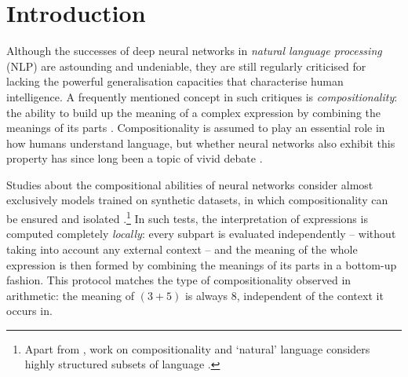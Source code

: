 \section{Introduction}

Although the successes of deep neural networks in \textit{natural language processing} (NLP) are astounding and undeniable, they are still regularly criticised for lacking the powerful generalisation capacities that characterise human intelligence.
A frequently mentioned concept in such critiques is \emph{compositionality}: the ability to build up the meaning of a complex expression by combining the meanings of its parts \citep[e.g.][]{partee1984compositionality}.
Compositionality is assumed to play an essential role in how humans understand language, but whether neural networks also exhibit this property has since long been a topic of vivid debate \citep[e.g.][]{fodor1988connectionism,smolensky1990tensor,marcus2003algebraic,nefdt2020puzzle}.

Studies about the compositional abilities of neural networks consider almost exclusively models trained on synthetic datasets, in which compositionality can be ensured and isolated \citep[e.g.][]{lake2018generalization,hupkes2020compositionality}.\footnote{
Apart from \citet{raunak2019compositionality}, work on compositionality and `natural' language considers highly structured subsets of language \citep[e.g.][]{kim2020cogs,keysers2019measuring}.}
In such tests, the interpretation of expressions is computed completely \emph{locally}: every subpart is evaluated independently -- without taking into account any external context -- and the meaning of the whole expression is then formed by combining the meanings of its parts in a bottom-up fashion.
This protocol matches the type of compositionality observed in arithmetic: the meaning of $(3 + 5)$ is always $8$, independent of the context it occurs in.

